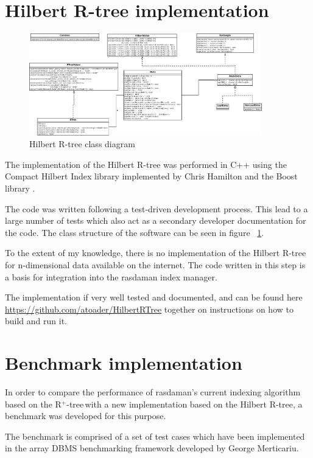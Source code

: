 \documentclass[11pt, a4paper, oneside]{article}
\newcommand{\rplus}{R$^+$-tree$\,$}
\begin{document}
\section{Hilbert R-tree implementation}
\label{sec:hrtree}

\begin{figure}
  \centering
    \includegraphics[width=0.9\textwidth]{img/ClassDiagram.png}
      \caption{Hilbert R-tree class diagram}
  \label{fig:class_diagram}
\end{figure}


The implementation of the Hilbert R-tree was performed in C++ using the Compact Hilbert Index library\cite{libhilbert} implemented by Chris Hamilton and the Boost library \cite{boost}.

The code was written following a test-driven development process. This lead to a large number of tests which also act as a secondary developer documentation for the code.
The class structure of the software can be seen in figure ~\ref{fig:class_diagram}.

To the extent of my knowledge, there is no implementation of the Hilbert R-tree for n-dimensional data available on the internet. The code written in this step is a basis for integration into the rasdaman index manager.

The implementation if very well tested and documented, and can be found here \url{https://github.com/atoader/HilbertRTree} together on instructions on how to build and run it.
\section{Benchmark implementation}
\label{sec:benchmark}
In order to compare the performance of rasdaman's current indexing algorithm based on the \rplus with a new implementation based on the Hilbert R-tree, a benchmark was developed for this purpose.

The benchmark is comprised of a set of test cases which have been implemented in the array DBMS benchmarking framework developed by George Merticariu\cite{GM}.
\end{document}
